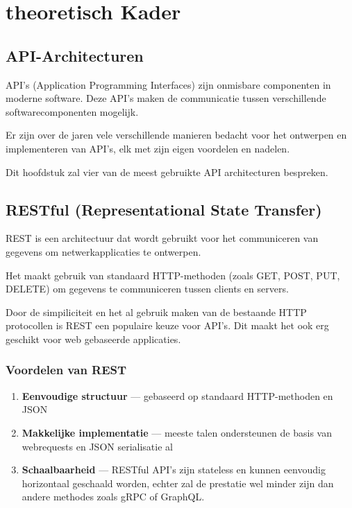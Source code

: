 \section{theoretisch Kader}
\label{sec:theoretisch kader}

\subsection{API-Architecturen}
API's (Application Programming Interfaces) zijn onmisbare componenten in moderne
software. Deze API's maken de communicatie tussen verschillende
softwarecomponenten mogelijk.\cite{Souza_2012}

Er zijn over de jaren vele verschillende manieren bedacht voor het ontwerpen
en implementeren van API's, elk met zijn eigen voordelen en nadelen.
\cite{Śliwa_Pańczyk_2021}

Dit hoofdstuk zal vier van de meest gebruikte API architecturen bespreken.

\subsection{RESTful (Representational State Transfer)}
\label{ssec:rest}
REST is een architectuur dat wordt gebruikt voor het communiceren van gegevens
om netwerkapplicaties te ontwerpen.

Het maakt gebruik van standaard HTTP-methoden (zoals GET, POST, PUT, DELETE)
om gegevens te communiceren tussen clients en servers.\cite{masse2011}

Door de simpiliciteit en het al gebruik maken van de bestaande HTTP protocollen
is REST een populaire keuze voor API's. Dit maakt het ook erg geschikt voor
web gebaseerde applicaties.

\subsubsection{Voordelen van REST}
\label{sssec:voordelen en nadelen van rest}
\begin{enumerate}
  \item \textbf{Eenvoudige structuur} --- gebaseerd op standaard HTTP-methoden
   en JSON
  \item \textbf{Makkelijke implementatie} --- meeste talen ondersteunen de basis
   van webrequests en JSON serialisatie al
  \item \textbf{Schaalbaarheid} --- RESTful API's zijn stateless en kunnen
   eenvoudig horizontaal geschaald worden, echter zal de prestatie wel minder
   zijn dan andere methodes zoals gRPC of GraphQL.\cite{Śliwa_Pańczyk_2021}
\end{enumerate}

